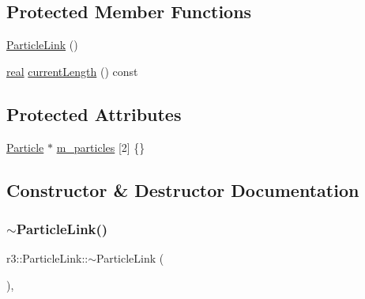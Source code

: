 \subsection*{Protected Member Functions}
\begin{DoxyCompactItemize}
\item 
\mbox{\hyperlink{classr3_1_1_particle_link_adc17e9225ff4f49803f5d5fe0a117af2}{Particle\+Link}} ()
\item 
\mbox{\hyperlink{namespacer3_ab2016b3e3f743fb735afce242f0dc1eb}{real}} \mbox{\hyperlink{classr3_1_1_particle_link_a5ad76e8eb6f9b78e3589c74e5d5013fc}{current\+Length}} () const
\end{DoxyCompactItemize}
\subsection*{Protected Attributes}
\begin{DoxyCompactItemize}
\item 
\mbox{\hyperlink{classr3_1_1_particle}{Particle}} $\ast$ \mbox{\hyperlink{classr3_1_1_particle_link_a2794d7fe45d905d9c11bb79be3d8e3c8}{m\+\_\+particles}} \mbox{[}2\mbox{]} \{\}
\end{DoxyCompactItemize}


\subsection{Constructor \& Destructor Documentation}
\mbox{\label{classr3_1_1_particle_link_a4477af9dbe9041010985492df2656e55}} 
\subsubsection{\texorpdfstring{$\sim$\+Particle\+Link()}{~ParticleLink()}}
{\footnotesize\ttfamily r3\+::\+Particle\+Link\+::$\sim$\+Particle\+Link (\begin{DoxyParamCaption}{ }\end{DoxyParamCaption})\hspace{0.3cm}{\ttfamily [virtual]}, {\ttfamily [default]}}

\mbox{\label{classr3_1_1_particle_link_adc17e9225ff4f49803f5d5fe0a117af2}} 
